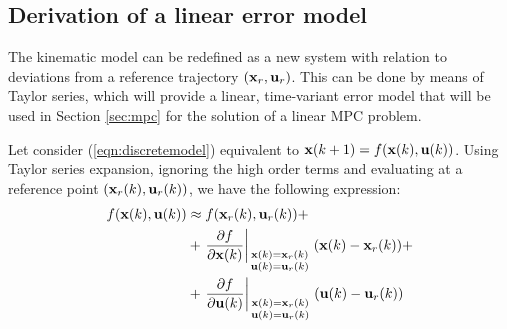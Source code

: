 \documentclass[twocolumn]{IEEEtran} %
\begin{document}
\subsection{Derivation of a linear error model}
The kinematic model can be redefined as a new system with relation to deviations from a reference trajectory $({\bf x}_r,{\bf u}_r)$. This can be done by means of Taylor series, which will provide a linear, time-variant error model that will be used in Section \ref{sec:mpc} for the solution of a linear MPC problem. 

Let consider (\ref{eqn:discretemodel}) equivalent to ${\bf x}(k+1)=f({\bf x}(k),{\bf u}(k))$. Using Taylor series expansion, ignoring the high order terms and evaluating at a reference point $({\bf x}_r(k),{\bf u}_r(k))$, we have the following expression:
\begin{align*}
	f({\bf x}(k),{\bf u}(k)) &\approx f({\bf x}_r(k),{\bf u}_r(k)) + \\ &+ \left.\frac{\partial f}{\partial{\bf x}(k)}\right|_{\begin{smallmatrix}{\bf x}(k)={\bf x}_r(k) \\ {\bf u}(k)={\bf u}_r(k) \end{smallmatrix}}({\bf x}(k)-{\bf x}_r(k)) + \\ &+ \left.\frac{\partial f}{\partial{\bf u}(k)}\right|_{\begin{smallmatrix}{\bf x}(k)={\bf x}_r(k) \\ {\bf u}(k)={\bf u}_r(k) \end{smallmatrix}}({\bf u}(k)-{\bf u}_r(k))
\end{align*}
\end{document}
